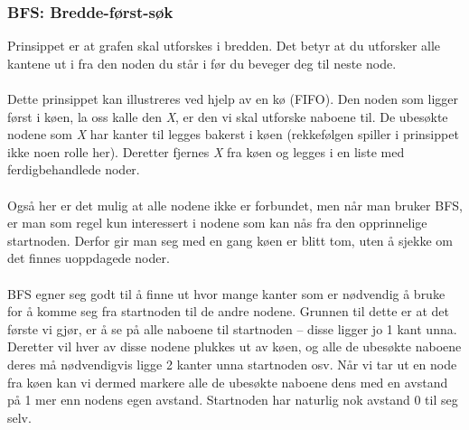 \subsubsection{BFS: Bredde-først-søk}
Prinsippet er at grafen skal utforskes i bredden. Det betyr at du utforsker alle kantene ut i fra den noden du står i før du beveger deg til neste node. 
\\\\
Dette prinsippet kan illustreres ved hjelp av en kø (FIFO). Den noden som ligger først i køen, la oss kalle den \textit{X}, er den vi skal utforske naboene til. De ubesøkte nodene som \textit{X} har kanter til legges bakerst i køen (rekkefølgen spiller i prinsippet ikke noen rolle her). Deretter fjernes \textit{X} fra køen og legges i en liste med ferdigbehandlede noder.
\\\\
Også her er det mulig at alle nodene ikke er forbundet, men når man bruker BFS, er man som regel kun interessert i nodene som kan nås fra den opprinnelige startnoden. Derfor gir man seg med en gang køen er blitt tom, uten å sjekke om det finnes uoppdagede noder.
\\\\
BFS egner seg godt til å finne ut hvor mange kanter som er nødvendig å bruke for å komme seg fra startnoden til de andre nodene. Grunnen til dette er at det første vi gjør, er å se på alle naboene til startnoden – disse ligger jo 1 kant unna. Deretter vil hver av disse nodene plukkes ut av køen, og alle de ubesøkte naboene deres må nødvendigvis ligge 2 kanter unna startnoden osv. Når vi tar ut en node fra køen kan vi dermed markere alle de ubesøkte naboene dens med en avstand på 1 mer enn nodens egen avstand. Startnoden har naturlig nok avstand 0 til seg selv.

